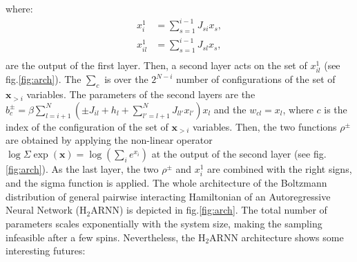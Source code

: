 \documentclass[aps,physrev,10pt,floatfix,reprint]{revtex4-2}
\begin{document}
where:
\begin{align}
    \label{eq:x_i_first}
    x_i^1 &= \sum_{s=1}^{i-1} J_{si} x_s,\\
    x_{il}^1 &= \sum_{s=1}^{i-1} J_{sl} x_s,\\
\end{align}
 are the output of the first layer. 
Then, a second layer acts on the set of $x_{il}^1$ (see fig.\ref{fig:arch}). The $\sum_{c}$ is over the $2^{N-i}$ number of configurations of the set of $\mathbf{x}_{>i}$ variables. 
The parameters of the second layers are the $b_c^{\pm} = \beta\sum_{l=i+1}^N (\pm J_{il} + h_l + \sum_{l'=l+1}^N J_{ll'}x_{l'}) x_l $ and the $w_{cl}=x_l$, where $c$ is the index of the configuration of the set of $\mathbf{x}_{>i}$ variables. Then, the two functions $\rho^{\pm}$ are obtained by applying the non-linear operator $\log \Sigma \exp (\mathbf{x}) = \log(\sum_i e^{x_i})$ at the output of the second layer (see fig.\ref{fig:arch}). 
As the last layer, the two $\rho^{\pm}$ and $x_i^1$ are combined with the right signs, and the sigma function is applied. The whole architecture of the Boltzmann distribution of general pairwise interacting Hamiltonian of an Autoregressive Neural Network ($\text{H}_2\text{ARNN}$) is depicted in fig.\ref{fig:arch}. The total number of parameters scales exponentially with the system size, making the sampling infeasible after a few spins.
Nevertheless, the $\text{H}_2\text{ARNN}$ architecture shows some interesting futures:
\end{document}
